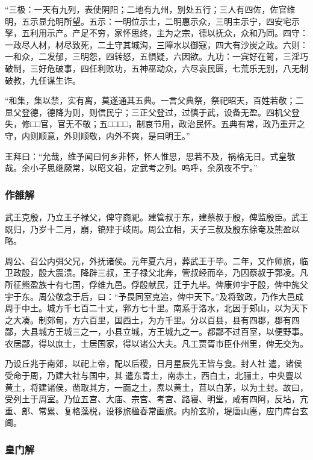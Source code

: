 \documentclass[]{article}
\begin{document}
``三极：一天有九列，表使阴阳；二地有九州，别处五行；三人有四佐，佐官维明，五示显允明所望。五示：一明位示士，二明惠示众，三明主示宁，四安宅示孥，五利用示产。产足不穷，家怀思终，主为之宗，德以抚众，众和乃同。四守：一政尽人材，材尽致死，二土守其城沟，三障水以御寇，四大有沙炭之政。六则：一和众，二发郁，三明怨，四转怒，五惧疑，六因欲。九功：一宾好在笥，三淫巧破制，三好危破事，四任利败功，五神巫动众，六尽哀民匮，七荒乐无别，八无制破教，九任谋生诈。

``和集，集以禁，实有离，莫遂通其五典。一言父典祭，祭祀昭天，百姓若敬；二显父登德，德降为则，则信民宁；三正父登过，过慎于武，设备无盈。四机父登失，修□□官，官无不敬；五□□□□，制哀节用，政治民怀。五典有常，政乃重开之守，内则顺意，外则顺敬，内外不爽，是曰明王。''

王拜曰：``允哉，维予闻曰何乡非怀，怀人惟思，思若不及，祸格无日。式皇敬哉。余小子思继厥常，以昭文祖，定武考之列。呜呼，余夙夜不宁。''

\hypertarget{header-n255}{%
\subsubsection{作雒解}\label{header-n255}}

武王克殷，乃立王子禄父，俾守商祀。建管叔于东，建蔡叔于殷，俾监殷臣。武王既归，乃岁十二月，崩，镐肂于岐周。周公立相，天子三叔及殷东徐奄及熊盈以略。

周公、召公内弭父兄，外抚诸侯。元年夏六月，葬武王于毕。二年，又作师旅，临卫政殷，殷大震溃。降辟三叔，王子禄父北奔，管叔经而卒，乃囚蔡叔于郭凌。凡所征熊盈族十有七国，俘维九邑。俘殷献民，迁于九毕。俾康帅宇于殷，俾中旄父宇于东。周公敬念于后，曰：``予畏同室克追，俾中天下。''及将致政，乃作大邑成周于中土。城方千七百二十丈，郛方七十里。南系于洛水，北因于郏山，以为天下之大凑。制郊甸，方六百里，国西土，为方千里。分以百县，县有四郡，郡有四鄙，大县城方王城三之一，小县立城，方王城九之一。都鄙不过百室，以便野事。农居鄙，得以庶士，士居国家，得以诸公大夫。凡工贾胥市臣仆州里，俾无交为。

乃设丘兆于南郊，以祀上帝，配以后稷，日月星辰先王皆与食。封人社遣，诸侯受命于周，乃建大社与国中，其遣东青土，南赤土，西白土，北骊土，中央亹以黄土，将建诸侯，凿取其方，一面之土，焘以黄土，苴以白茅，以为土封。故曰，受列土于周室。乃位五宫、大庙、宗宫、考宫、路寝、明堂，咸有四阿，反坫，亢重、郎、常累、复格藻棁，设移旅楹舂常画旅。内阶玄阶，堤唐山廧，应门库台玄阃。

\hypertarget{header-n259}{%
\subsubsection{皇门解}\label{header-n259}}
\end{document}
